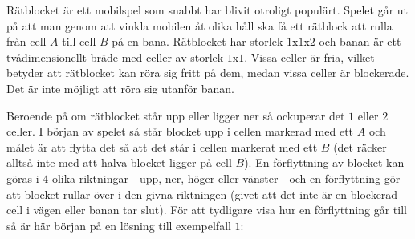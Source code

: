 
\noindent Rätblocket är ett mobilspel som snabbt har blivit otroligt populärt. Spelet går ut på att man genom att vinkla mobilen åt olika håll ska få ett rätblock att rulla från cell $A$ till cell $B$ på en bana. Rätblocket har storlek $1$x$1$x$2$ och banan är ett tvådimensionellt bräde med celler av storlek $1$x$1$. Vissa celler är fria, vilket betyder att rätblocket kan röra sig fritt på dem, medan vissa celler är blockerade. Det är inte möjligt att röra sig utanför banan.

Beroende på om rätblocket står upp eller ligger ner så ockuperar det $1$ eller $2$ celler. I början av spelet så står blocket upp i cellen markerad med ett $A$ och målet är att flytta det så att det står i cellen markerat med ett $B$ (det räcker alltså inte med att halva blocket ligger på cell $B$). En förflyttning av blocket kan göras i $4$ olika riktningar - upp, ner, höger eller vänster - och en förflyttning gör att blocket rullar över i den givna riktningen (givet att det inte är en blockerad cell i vägen eller banan tar slut). För att tydligare visa hur en förflyttning går till så är här början på en lösning till exempelfall $1$:

